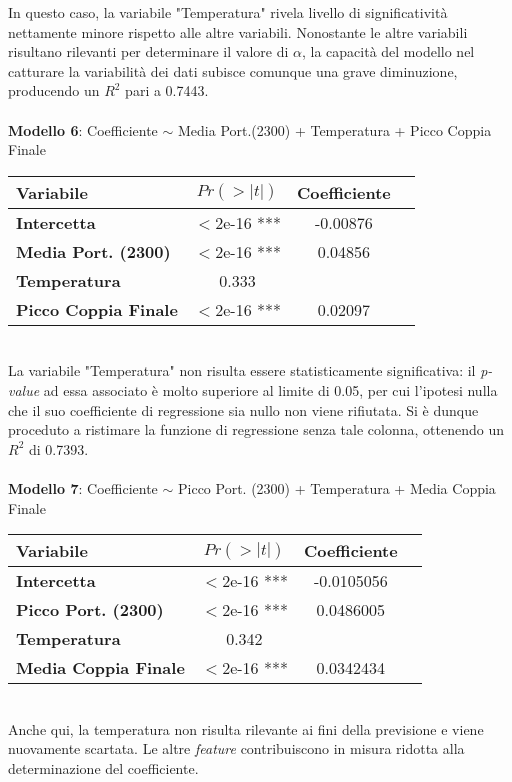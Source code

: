\documentclass[fleqn,10pt]{SelfArx} %
\begin{document}
In questo caso, la variabile "Temperatura" rivela livello di significatività nettamente minore rispetto alle altre variabili. Nonostante le altre variabili risultano rilevanti per determinare il valore di $\alpha$, la capacità del modello nel catturare la variabilità dei dati subisce comunque una grave diminuzione, producendo un $R^2$ pari a 0.7443.\\
\\
\textbf{Modello 6}: Coefficiente $\sim$ Media Port.(2300) + Temperatura + Picco Coppia Finale
{\begin{table}[h] 
\centering
\begin{tabular}[t]{lccc}
\toprule 
Variabile&$Pr(> |t|)$&Coefficiente\\
\midrule 
\textbf{Intercetta}&$<$2e-16 ***&-0.00876\\ 
\textbf{Media Port. (2300)}&$<$2e-16 ***&0.04856\\
\textbf{Temperatura}&0.333\\
\textbf{Picco Coppia Finale}&$<$2e-16 ***&0.02097\\
\bottomrule 
\end{tabular}
\end{table}}\\
La variabile "Temperatura" non risulta essere statisticamente significativa: il \textit{p-value} ad essa associato è molto superiore al limite di 0.05, per cui l'ipotesi nulla che il suo coefficiente di regressione sia nullo non viene rifiutata. Si è dunque proceduto a ristimare la funzione di regressione senza tale colonna, ottenendo un $R^2$ di 0.7393.\\
\\
\textbf{Modello 7}: Coefficiente $\sim$ Picco Port. (2300) + Temperatura + Media Coppia Finale
{\begin{table}[h] 
\centering
\begin{tabular}[t]{lccc}
\toprule 
Variabile&$Pr(> |t|)$&Coefficiente\\
\midrule 
\textbf{Intercetta}&$<$2e-16 ***&-0.0105056\\ 
\textbf{Picco Port. (2300)}&$<$2e-16 ***&0.0486005\\
\textbf{Temperatura}&0.342\\
\textbf{Media Coppia Finale}&$<$2e-16 ***&0.0342434\\
\bottomrule 
\end{tabular}
\end{table}}\\
Anche qui, la temperatura non risulta rilevante ai fini della previsione e viene nuovamente scartata. Le altre \textit{feature} contribuiscono in misura ridotta alla determinazione del coefficiente.
\end{document}
